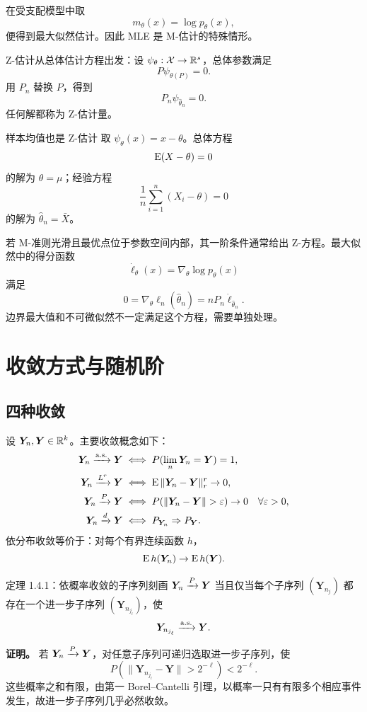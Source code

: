 在受支配模型中取
\[
 m_\theta(x)=\log p_\theta(x),
\]
便得到最大似然估计。因此 MLE 是 M-估计的特殊情形。

Z-估计从总体估计方程出发：设 $\psi_\theta:\mathcal X\to\mathbb R^s$，总体参数满足
\[
 P\psi_{\theta(P)}=0.
\]
用 $P_n$ 替换 $P$，得到
\[
 \boxed{P_n\psi_{\widehat\theta_n}=0.}
\]
任何解都称为 Z-估计量。

\begin{examplebox}{样本均值也是 Z-估计}
取 $\psi_\theta(x)=x-\theta$。总体方程
\[
 \operatorname{E}(X-\theta)=0
\]
的解为 $\theta=\mu$；经验方程
\[
 \frac1n\sum_{i=1}^n(X_i-\theta)=0
\]
的解为 $\widehat\theta_n=\bar X$。
\end{examplebox}

若 M-准则光滑且最优点位于参数空间内部，其一阶条件通常给出 Z-方程。最大似然中的得分函数
\[
 \dot\ell_\theta(x)=\nabla_\theta\log p_\theta(x)
\]
满足
\[
 0=\nabla_\theta\ell_n(\widehat\theta_n)
 =nP_n\dot\ell_{\widehat\theta_n}.
\]
边界最大值和不可微似然不一定满足这个方程，需要单独处理。

\section{收敛方式与随机阶}

\subsection{四种收敛}

设 $\bm Y_n,\bm Y\in\mathbb R^k$。主要收敛概念如下：
\begin{align*}
 \bm Y_n\asto\bm Y
 &\iff P(\lim_n\bm Y_n=\bm Y)=1,\\
 \bm Y_n\xrightarrow{L^r}\bm Y
 &\iff \E\|\bm Y_n-\bm Y\|_r^r\to0,\\
 \bm Y_n\pto\bm Y
 &\iff P(\|\bm Y_n-\bm Y\|>\varepsilon)\to0
       \quad\forall\varepsilon>0,\\
 \bm Y_n\dto\bm Y
 &\iff P_{\bm Y_n}\Rightarrow P_{\bm Y}.
\end{align*}
依分布收敛等价于：对每个有界连续函数 $h$，
\[
 \operatorname{E} h(\bm Y_n)\to\operatorname{E} h(\bm Y).
\]

\begin{definitionbox}{定理 1.4.1：依概率收敛的子序列刻画}
$\bm Y_n\xrightarrow{P}\bm Y$ 当且仅当每个子序列 $(\bm Y_{n_j})$ 都存在一个进一步子序列 $(\bm Y_{n_{j_\ell}})$，使
\[
 \bm Y_{n_{j_\ell}}\xrightarrow{\mathrm{a.s.}}\bm Y.
\]
\end{definitionbox}

\textbf{证明。} 若 $\bm Y_n\xrightarrow{P}\bm Y$，对任意子序列可递归选取进一步子序列，使
\[
 P(\|\bm Y_{n_{j_\ell}}-\bm Y\|>2^{-\ell})<2^{-\ell}.
\]
这些概率之和有限，由第一 Borel--Cantelli 引理，以概率一只有有限多个相应事件发生，故进一步子序列几乎必然收敛。

